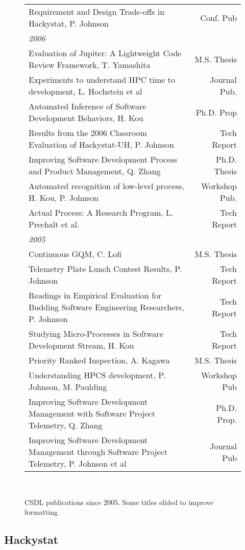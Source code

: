 \documentclass[11pt]{article}
\begin{document}
\begin{figure}[!ht]
\begin{tabular}{p{5.5in}r}
Requirement and Design Trade-offs in Hackystat, P. Johnson  & Conf. Pub \\
{\em 2006} & \\
Evaluation of Jupiter: A Lightweight Code Review Framework, T. Yamashita & M.S. Thesis \\
Experiments to understand HPC time to development, L. Hochstein et al  & Journal Pub. \\
Automated Inference of Software Development Behaviors, H. Kou  & Ph.D. Prop \\
Results from the 2006 Classroom Evaluation of Hackystat-UH, P. Johnson  & Tech Report \\
Improving Software Development Process and Product Management, Q. Zhang  & Ph.D. Thesis \\
Automated recognition of low-level process, H. Kou, P. Johnson  & Workshop Pub. \\
Actual Process: A Research Program, L. Prechalt et al.  & Tech Report \\
{\em 2005} & \\
Continuous GQM, C. Lofi  & M.S. Thesis \\
Telemetry Plate Lunch Contest Results, P. Johnson  & Tech Report \\
Readings in Empirical Evaluation for Budding Software Engineering Researchers, P. Johnson  & Tech Report \\
Studying Micro-Processes in Software Development Stream, H. Kou  & Tech Report \\
Priority Ranked Inspection, A. Kagawa  & M.S. Thesis \\
Understanding HPCS development, P. Johnson, M. Paulding  & Workshop Pub \\
Improving Software Development Management with Software Project Telemetry, Q. Zhang  & Ph.D. Prop. \\
Improving Software Development Management through Software Project Telemetry, P. Johnson et al  & Journal Pub \\ \hline
\end{tabular} \\ 
\normalsize
\caption{CSDL publications since 2005. Some titles elided to improve formatting}
\label{fig:pubs}
\end{figure}

\newpage
\subsection{Hackystat}
\end{document}
